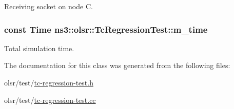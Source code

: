 Receiving socket on node C. 

\subsubsection[{\texorpdfstring{m\+\_\+time}{m_time}}]{\setlength{\rightskip}{0pt plus 5cm}const {\bf Time} ns3\+::olsr\+::\+Tc\+Regression\+Test\+::m\+\_\+time\hspace{0.3cm}{\ttfamily [private]}}\hypertarget{classns3_1_1olsr_1_1TcRegressionTest_abe52319ff844af6f88afe7630ffa89fd}{}\label{classns3_1_1olsr_1_1TcRegressionTest_abe52319ff844af6f88afe7630ffa89fd}


Total simulation time. 



The documentation for this class was generated from the following files\+:\begin{DoxyCompactItemize}
\item 
olsr/test/\hyperlink{tc-regression-test_8h}{tc-\/regression-\/test.\+h}\item 
olsr/test/\hyperlink{tc-regression-test_8cc}{tc-\/regression-\/test.\+cc}\end{DoxyCompactItemize}
